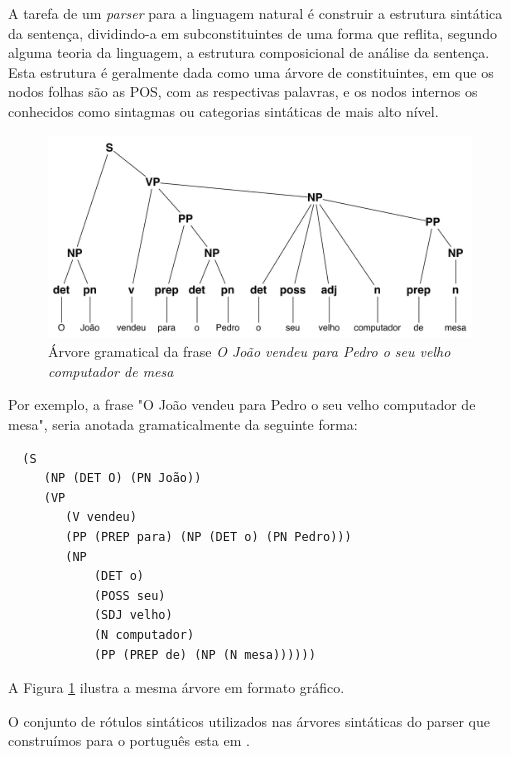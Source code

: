A tarefa de um \emph{parser} para a linguagem natural é construir a estrutura sintática da sentença, dividindo-a em subconstituintes de uma forma que reflita, segundo alguma teoria da linguagem, a estrutura composicional de análise da sentença. Esta estrutura é geralmente dada como uma árvore de constituintes, em que os nodos folhas são as POS, com as respectivas palavras, e os nodos internos os conhecidos como sintagmas ou categorias sintáticas de mais alto nível.

\begin{figure}
	\begin{center}
		\includegraphics[scale=0.5]{tree.pdf}
		\caption{\label{tree} Árvore gramatical da frase \emph{O João vendeu para Pedro o seu velho computador de mesa}}

	\end{center}
\end{figure}

Por exemplo, a frase "O João vendeu para Pedro o seu velho computador de mesa", seria anotada gramaticalmente da seguinte forma:

\begin{verbatim}
  (S
     (NP (DET O) (PN João))
     (VP
        (V vendeu)
        (PP (PREP para) (NP (DET o) (PN Pedro)))
        (NP
            (DET o)
            (POSS seu)
            (SDJ velho)
            (N computador)
            (PP (PREP de) (NP (N mesa))))))
\end{verbatim}

			
A Figura \ref{tree} ilustra a mesma árvore em formato gráfico.

O conjunto de rótulos sintáticos utilizados nas árvores sintáticas do parser que construímos para o português esta em \cite{florestasintatica}.




